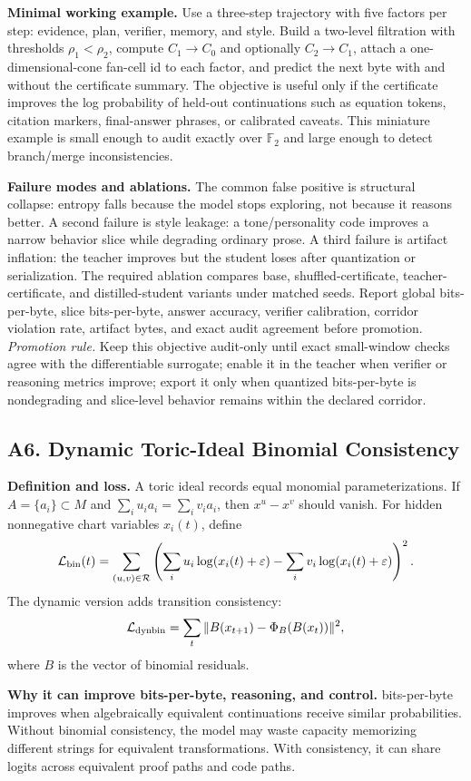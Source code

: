 \documentclass[10pt]{article}
\newcommand{\FF}{\mathbb{F}}
\newcommand{\loss}{\mathcal{L}}
\newcommand{\eps}{\varepsilon}
\numberwithin{equation}{section}
\begin{document}
\noindent\textbf{Minimal working example.} Use a three-step trajectory with five factors per step: evidence, plan, verifier, memory, and style. Build a two-level filtration with thresholds $\rho_1<\rho_2$, compute $C_1\to C_0$ and optionally $C_2\to C_1$, attach a one-dimensional-cone fan-cell id to each factor, and predict the next byte with and without the certificate summary. The objective is useful only if the certificate improves the log probability of held-out continuations such as equation tokens, citation markers, final-answer phrases, or calibrated caveats. This miniature example is small enough to audit exactly over $\FF_2$ and large enough to detect branch/merge inconsistencies.

\noindent\textbf{Failure modes and ablations.} The common false positive is structural collapse: entropy falls because the model stops exploring, not because it reasons better. A second failure is style leakage: a tone/personality code improves a narrow behavior slice while degrading ordinary prose. A third failure is artifact inflation: the teacher improves but the student loses after quantization or serialization. The required ablation compares base, shuffled-certificate, teacher-certificate, and distilled-student variants under matched seeds. Report global bits-per-byte, slice bits-per-byte, answer accuracy, verifier calibration, corridor violation rate, artifact bytes, and exact audit agreement before promotion.
\vfill
\noindent\emph{Promotion rule.} Keep this objective audit-only until exact small-window checks agree with the differentiable surrogate; enable it in the teacher when verifier or reasoning metrics improve; export it only when quantized bits-per-byte is nondegrading and slice-level behavior remains within the declared corridor.
\clearpage
\subsection{A6. Dynamic Toric-Ideal Binomial Consistency}
\noindent\textbf{Definition and loss.} A toric ideal records equal monomial parameterizations. If $A=\{a_i\}\subset M$ and $\sum_i u_i a_i=\sum_i v_i a_i$, then $x^u-x^v$ should vanish. For hidden nonnegative chart variables $x_i(t)$, define
\[
\loss_{\rm bin}(t)=\sum_{(u,v)\in\mathcal R}\left(\sum_i u_i\log(x_i(t)+\eps)-\sum_i v_i\log(x_i(t)+\eps)\right)^2.
\]
The dynamic version adds transition consistency:
\[
\loss_{\rm dynbin}=\sum_t\|B(x_{t+1})-\Phi_B(B(x_t))\|^2,
\]
where $B$ is the vector of binomial residuals.

\noindent\textbf{Why it can improve bits-per-byte, reasoning, and control.} bits-per-byte improves when algebraically equivalent continuations receive similar probabilities. Without binomial consistency, the model may waste capacity memorizing different strings for equivalent transformations. With consistency, it can share logits across equivalent proof paths and code paths.
\end{document}

